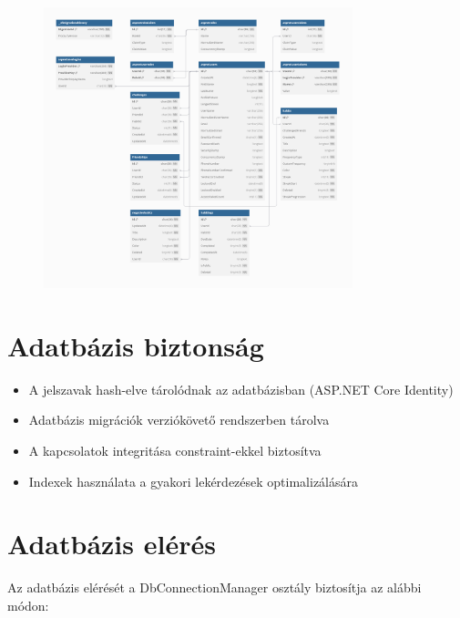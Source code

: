 \documentclass[12pt]{report}
\begin{document}
\begin{figure}[H]
    \centering
    \includegraphics[width=0.8\textwidth, height=0.8\textheight, keepaspectratio]{src/diagram_full.png}
\end{figure}

\section{Adatbázis biztonság}
\begin{itemize}
  \item A jelszavak hash-elve tárolódnak az adatbázisban (ASP.NET Core Identity)
  \item Adatbázis migrációk verziókövető rendszerben tárolva
  \item A kapcsolatok integritása constraint-ekkel biztosítva
  \item Indexek használata a gyakori lekérdezések optimalizálására
\end{itemize}

\section{Adatbázis elérés}
Az adatbázis elérését a DbConnectionManager osztály biztosítja az alábbi módon:
\end{document}

